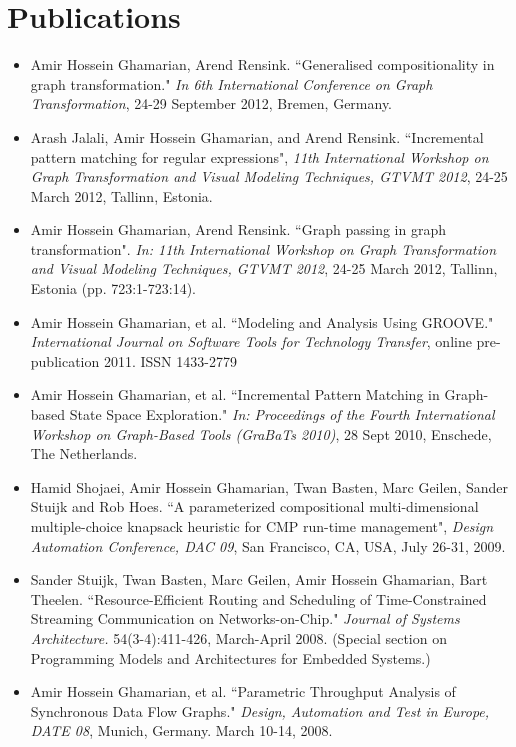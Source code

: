 \section{Publications}
\begin{itemize}
\item Amir Hossein Ghamarian, Arend Rensink. ``Generalised compositionality in graph transformation." \emph{In 6th International Conference on Graph Transformation}, 24-29 September 2012, Bremen, Germany.
\item Arash Jalali, Amir Hossein Ghamarian, and Arend Rensink. ``Incremental pattern matching for regular expressions", \emph{11th International Workshop on Graph Transformation and Visual Modeling Techniques, GTVMT 2012}, 24-25 March 2012, Tallinn, Estonia.
\item Amir Hossein Ghamarian, Arend Rensink. ``Graph passing in graph transformation". \emph{In: 11th International Workshop on Graph Transformation and Visual Modeling Techniques, GTVMT 2012}, 24-25 March 2012, Tallinn, Estonia (pp. 723:1-723:14).
\item Amir Hossein Ghamarian, et al. ``Modeling and Analysis Using GROOVE." \emph{
International Journal on Software Tools for Technology Transfer},
online pre-publication 2011. ISSN 1433-2779

\item Amir Hossein Ghamarian, et al. ``Incremental
Pattern Matching in Graph-based State Space Exploration." \emph{In: Proceedings of the Fourth
International Workshop on Graph-Based Tools (GraBaTs 2010)}, 28 Sept 2010, Enschede, The Netherlands.

\item Hamid Shojaei, Amir Hossein Ghamarian, Twan Basten, Marc Geilen, Sander Stuijk and Rob Hoes.
``A parameterized compositional multi-dimensional multiple-choice knapsack heuristic for CMP run-time management",
\emph{Design Automation Conference, DAC 09}, San Francisco, CA, USA, July 26-31, 2009.

\item Sander Stuijk, Twan
Basten, Marc Geilen, Amir Hossein Ghamarian, Bart Theelen.
``Resource-Efficient Routing and Scheduling of Time-Constrained
Streaming Communication on Networks-on-Chip." \emph{Journal of
Systems Architecture.} 54(3-4):411-426, March-April 2008. (Special
section on Programming Models and Architectures for Embedded
Systems.)

\item Amir Hossein Ghamarian, et al. ``Parametric Throughput Analysis of
Synchronous Data Flow Graphs." \emph{Design, Automation and Test in
Europe, DATE 08}, Munich, Germany. March 10-14, 2008.


\end{itemize}
